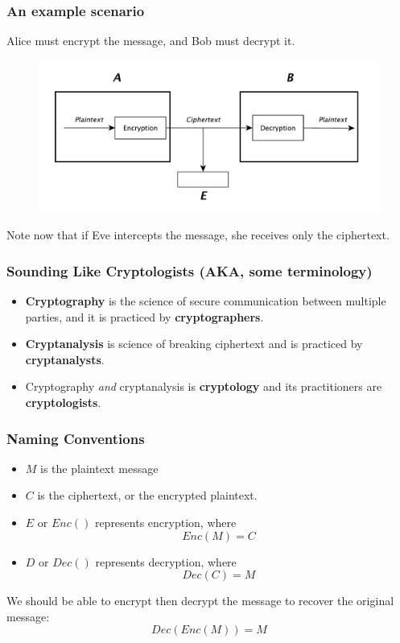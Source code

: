 \documentclass{beamer}
\newcommand{\<}{\langle}
\renewcommand{\>}{\rangle}
\begin{document}
\begin{frame}
\frametitle{An example scenario}

Alice must encrypt the message, and Bob must decrypt it. 

\begin{figure}
\includegraphics[scale=.5]{IMG/diag4.pdf}
\end{figure}
Note now that if Eve intercepts the message, she receives only the ciphertext. 
\end{frame}





\begin{frame}
\frametitle{Sounding Like Cryptologists (AKA, some terminology)}

\begin{itemize}
\item \textbf{Cryptography} is the science of secure communication between multiple parties, and it is practiced by \textbf{cryptographers}. 
\item \textbf{Cryptanalysis} is science of breaking ciphertext and is practiced by \textbf{cryptanalysts}.
\item Cryptography \emph{and} cryptanalysis is \textbf{cryptology} and its practitioners are \textbf{cryptologists}. 
\end{itemize}
\end{frame}

\begin{frame}
\frametitle{Naming Conventions}

\begin{itemize}
\item $M$ is the plaintext message
\item $C$ is the ciphertext, or the encrypted plaintext. 
\item $E$ or $Enc()$ represents encryption, where 
\[ 
Enc(M) = C
\]
\item $D$ or $Dec()$ represents decryption, where 
\[
Dec(C) = M
\]
\end{itemize}

We should be able to encrypt then decrypt the message to recover the original message:
\[
Dec(Enc(M)) = M
\]
\end{frame}
\end{document}
